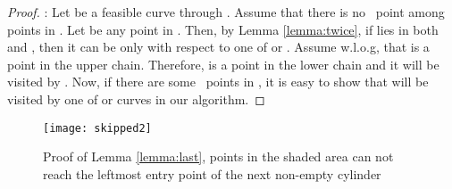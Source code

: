 \documentclass[a4paper,UKenglish]{lipics}
\newcommand{\REM}[1]{}
\newcommand{\DoubleB}{Double-TypeB}
\begin{document}
\begin{proof}
:
Let  be a feasible curve through .
Assume that there is  no \TwiceB ~point
among points in . Let  be any point in .
Then, by Lemma \ref{lemma:twice}, if 
 lies in both  and
, then it can be  only 
with respect to one of  or .
Assume w.l.o.g, that  is a  point in the 
upper chain. Therefore,  is a  point in the 
lower chain and  it will be visited by 
. Now, if  there are some \TwiceB ~points in ,
it is easy to show that   will be visited  by one of 
 or  curves in our algorithm.





\REM{
\ref{}   and 
walk along their path, keeping distance 
to each other, until 
  reaches to vertex  in 
and  reaches to point  on the boundary of 
where .
}



\REM{
we can construct a feasible curve:
Lemma \ref{lemma:twice} ensures if a point 
which is  in the upper chain, 
can not be    again in the lower chain
and vice versa, a point 
which is  in the lower chain, 
can not be    again in the upper chain;
unless it is located within  area.

Therefore, we start from point , process 
cylinders one by one and visit all  
points in each cylinder. If we encounter a  point, 
we ignore it, because that point will become  point
later and we can visit it. 
Let  and  denote 
\DoubleB areas.
Now, to take care of \TwiceB ~points, 
build these two curves :
\begin{itemize}
\item : when walking on , ignore rival of  in 
and  and visit those  points. 
\item : when walking on , ignore rival of  in 
and  and visit those  points.
\end{itemize}

Return YES, if any of  or  visits every point in ;
otherwise, return NO. 
}
\end{proof}






\begin{figure}[t]
\centering
	\texttt{[image: skipped2]}	
	\caption{Proof of Lemma \ref{lemma:last}, points in the 
shaded area can not reach the leftmost entry point of
the next non-empty cylinder }	
	\label{fig:skipped}
\end{figure}
\end{document}
